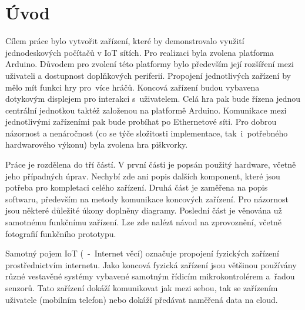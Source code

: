 \section{Úvod}
Cílem práce bylo vytvořit zařízení, které by demonstrovalo využití jednodeskových počítačů v IoT sítích. Pro realizaci byla zvolena platforma Arduino. Důvodem pro zvolení této platformy bylo především její rozšíření mezi uživateli a dostupnost doplňkových periferií. Propojení jednotlivých zařízení by mělo mít funkci hry pro~více hráčů. Koncová zařízení budou vybavena dotykovým displejem pro interakci s~uživatelem. Celá hra pak bude řízena jednou centrální jednotkou taktéž založenou na platformě Arduino. Komunikace mezi jednotlivými zařízeními pak bude probíhat po Ethernetové síti. Pro dobrou názornost a nenáročnost (co se týče složitosti implementace, tak~i~potřebného hardwarového výkonu) byla zvolena hra piškvorky.

Práce je rozdělena do tří částí. V první části je popsán použitý hardware, včetně jeho případných úprav. Nechybí zde ani popis dalších komponent, které jsou potřeba pro kompletaci celého zařízení. Druhá část je zaměřena na popis softwaru, především na metody komunikace koncových zařízení. Pro názornost jsou některé důležité úkony doplněny diagramy. Poslední část je věnována už samotnému funkčnímu zařízení. Lze zde nalézt návod na zprovoznění, včetně fotografií funkčního prototypu.


Samotný pojem IoT (~-~Internet věcí) označuje propojení fyzických zařízení prostřednictvím internetu. Jako koncová fyzická zařízení jsou většinou používány různé vestavěné systémy vybavené samotným řídicím mikrokontrolérem a~řadou senzorů. Tato zařízení dokáží komunikovat jak mezi sebou, tak se zařízením uživatele (mobilním telefon) nebo dokáží předávat naměřená data na cloud.

